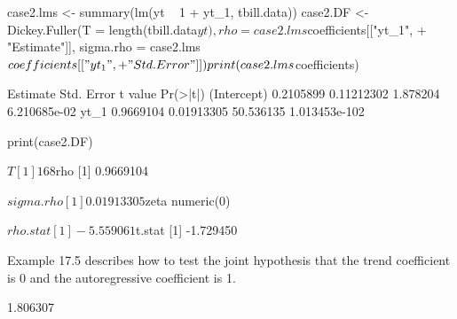 \documentclass[a4paper]{article}
\begin{document}
\begin{Schunk}
\begin{Sinput}
 case2.lms <- summary(lm(yt ~ 1 + yt_1, tbill.data))
 case2.DF <- Dickey.Fuller(T = length(tbill.data$yt), rho = case2.lms$coefficients[["yt_1", 
+     "Estimate"]], sigma.rho = case2.lms$coefficients[["yt_1", 
+     "Std. Error"]])
 print(case2.lms$coefficients)
\end{Sinput}
\begin{Soutput}
             Estimate Std. Error   t value      Pr(>|t|)
(Intercept) 0.2105899 0.11212302  1.878204  6.210685e-02
yt_1        0.9669104 0.01913305 50.536135 1.013453e-102
\end{Soutput}
\begin{Sinput}
 print(case2.DF)
\end{Sinput}
\begin{Soutput}
$T
[1] 168

$rho
[1] 0.9669104

$sigma.rho
[1] 0.01913305

$zeta
numeric(0)

$rho.stat
[1] -5.559061

$t.stat
[1] -1.729450
\end{Soutput}
\end{Schunk}
Example 17.5 describes how to test the joint hypothesis that the trend coefficient is 0 and the autoregressive
coefficient is 1.
\begin{Schunk}
\begin{Soutput}
[1] 1.806307
\end{Soutput}
\end{Schunk}
\end{document}
